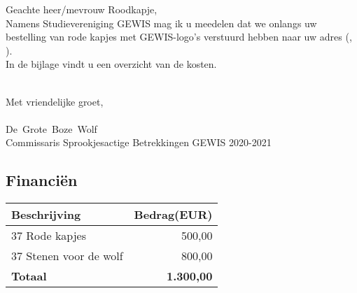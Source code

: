\documentclass[
 digital,         %
 english         %
]{GEWISLetter}
\newcommand{\dewolf}{De~Grote~Boze~Wolf\xspace}
\newcommand{\rood}{Roodkapje\xspace}
\begin{document}
\GEWISfirstpage                 %
\printadresenkenmerk            %

Geachte heer/mevrouw \rood,\\

Namens Studievereniging GEWIS mag ik u meedelen dat we onlangs uw bestelling van rode kapjes met GEWIS-logo's verstuurd hebben naar uw adres (\GEWISstreet, \GEWISpostcodecity).\\

In de bijlage vindt u een overzicht van de kosten.\\

\lipsum[1]\\

\lipsum[2-5]

Met vriendelijke groet,\\[3\baselineskip] \\
\dewolf\\
Commissaris Sprookjesactige Betrekkingen GEWIS 2020-2021


\resetpagecount
\GEWISsmallheading
\newpage
\subsection{Financi\"en}
\begin{tabularx}{\textwidth}{X r}\toprule
	Beschrijving           & Bedrag(EUR)\\\midrule
	37 Rode kapjes         & 500,00\\
	37 Stenen voor de wolf & 800,00\\
	\cmidrule{2-2} \textbf{Totaal} & {\bfseries 1.300,00}\\\bottomrule
\end{tabularx}



\resetpagecount
\GEWISfirstpage
\printadresenkenmerk

\lipsum[1]
\end{document}
